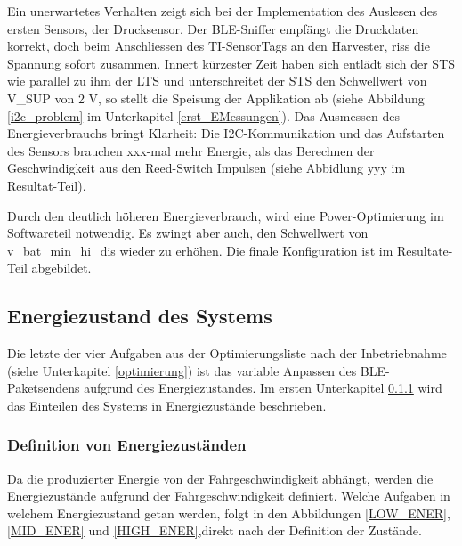 Ein unerwartetes Verhalten zeigt sich bei der Implementation des Auslesen des ersten Sensors, der Drucksensor. Der BLE-Sniffer empfängt die Druckdaten korrekt, doch beim Anschliessen des TI-SensorTags an den Harvester, riss die Spannung sofort zusammen. Innert kürzester Zeit haben sich entlädt sich der STS wie parallel zu ihm der LTS und unterschreitet der STS den Schwellwert von V\_SUP von 2 V, so stellt die Speisung der Applikation ab (siehe Abbildung \ref{i2c_problem} im Unterkapitel \ref{erst_EMessungen}). Das Ausmessen des Energieverbrauchs bringt Klarheit: Die I2C-Kommunikation und das Aufstarten des Sensors brauchen xxx-mal mehr Energie, als das Berechnen der Geschwindigkeit aus den Reed-Switch Impulsen (siehe Abbidlung yyy im Resultat-Teil).

Durch den deutlich höheren Energieverbrauch, wird eine Power-Optimierung im Softwareteil notwendig. Es zwingt aber auch, den Schwellwert von v\_bat\_min\_hi\_dis  wieder zu erhöhen. Die finale Konfiguration ist im Resultate-Teil abgebildet.


\subsection{Energiezustand des Systems}
\label{v_energiezustand}

Die letzte der vier Aufgaben aus der Optimierungsliste nach der Inbetriebnahme (siehe Unterkapitel \ref{optimierung}) ist das variable Anpassen des BLE-Paketsendens aufgrund des Energiezustandes. Im ersten Unterkapitel \ref{def_zustaende} wird das Einteilen des Systems in Energiezustände beschrieben. %


\subsubsection{Definition von Energiezuständen}
\label{def_zustaende} 

Da die produzierter Energie von der Fahrgeschwindigkeit abhängt, werden die Energiezustände aufgrund der Fahrgeschwindigkeit definiert. Welche Aufgaben in welchem Energiezustand getan werden, folgt in den Abbildungen \ref{LOW_ENER}, \ref{MID_ENER} und \ref{HIGH_ENER},direkt nach der Definition der Zustände. 


